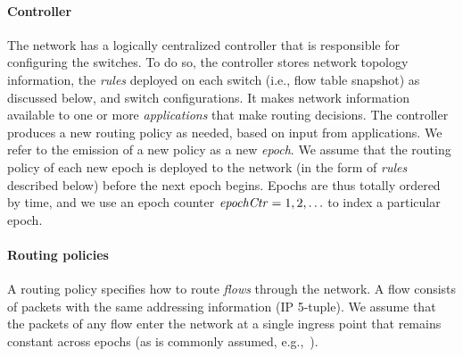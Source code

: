 \paragraph{Controller}
The network has a logically centralized controller that is responsible
for configuring the switches.  To do so, the controller stores network
topology information, the \textit{rules} deployed on each switch
(i.e., flow table snapshot) as discussed below, and switch
configurations.  It makes network information available to one or more
\textit{applications} that make routing decisions.  The controller
produces a new routing policy as needed, based on input from
applications.  We refer to the emission of a new policy as a new
\textit{epoch}.  We assume that the routing policy of each new epoch
is deployed to the network (in the form of \textit{rules} described
below) before the next epoch begins.  Epochs are thus totally ordered
by time, and we use an epoch counter $\mathit{epochCtr} = 1, 2, \ldots$ to
index a particular epoch.

\iffalse
An application informs the controller of a new route by calling the
interface \pathMod{\flowSpec}{\pathID{}}{\prtLevel} to specify a new
path \pathID{} (or drop action) for a set of flows specified by
\flowSpec (e.g., by IP 5-tuple).
\mkr{We don't use \prtLevel anywhere in the algorithm description or
  in the definition of SCC.  Suggest we drop this.}
The path \pathID{} is represented
by a list of switches $\switchID{\switchIdx} \rightarrow
... \rightarrow \switchID{\switchIdxAlt}$ where each $\switchID{}$ is
a switch id (or the application can specify $\dropAction$ to represent
the drop action). The priority level $\prtLevel$ indicates the
priority of this path.  \iffalse If the application requires higher
priority than other applications, it can issue commands with
$\prtLevel = high$ to ensure the rules deployed on switches of the
highest priority.  \fi The application leverages this interface to
provide a route change of a specific flow to the controller.  To
specify correctness for our protocol, we assume that the \pathMod
interface is invoked sequentially, and we denote by \pathModIdx the
index of a specific \pathMod invocation.
\fi

\paragraph{Routing policies} A routing policy specifies how to route
\textit{flows} through the network.  A flow consists of packets with
the same addressing information (IP 5-tuple).  We assume that the
packets of any flow enter the network at a single ingress point that
remains constant across epochs (as is commonly assumed,
e.g.,~\cite{CU}).
\iffalse
\footnote{This assumption can be relaxed through
  techniques to support migration, e.g.,~\cite{lime}.}
\fi

